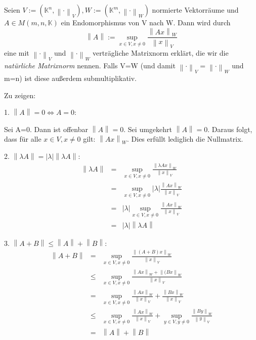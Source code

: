 \documentclass[10pt]{scrbook}
\begin{document}
\begin{Sa}
Seien $V:=(\mathbb{K}^n, \left\|\cdot\right\|_V), W:=(\mathbb{K}^m, \left\|\cdot\right\|_W)$ normierte Vektorräume und $A\in M(m, n, \mathbb{K})$ ein Endomorphismus von V nach W. Dann wird durch
\begin{displaymath}
	 \left\|A\right\|:=\sup_{x\in V, x\neq 0}\frac{\left\|A x\right\|_W}{\left\|x\right\|_V}
\end{displaymath}
eine mit $\left\|\cdot\right\|_V$ und $\left\|\cdot\right\|_W$ verträgliche Matrixnorm erklärt, die wir die \emph{natürliche Matrixnorm} nennen. Falls V=W (und damit $\left\|\cdot\right\|_V=\left\|\cdot\right\|_W$ und m=n) ist diese außerdem submultiplikativ.
\end{Sa}
\begin{bew}
Zu zeigen:

1. $\left\|A\right\|=0\Leftrightarrow A=0$:

Sei A=0. Dann ist offenbar $\left\|A\right\|=0$. Sei umgekehrt $\left\|A\right\|=0$. Daraus folgt, dass für alle $x\in V, x\neq 0$ gilt: $\left\|A x\right\|_W$. Dies erfüllt lediglich die Nullmatrix.

2. $\left\|\lambda A\right\|=\left|\lambda\right| \left\|\lambda A\right\|$:
\begin{eqnarray*}
\left\|\lambda A\right\| & = & \sup_{x\in V, x\neq 0}\frac{\left\|\lambda A x\right\|_W}{\left\|x\right\|_V} \\
& = & \sup_{x\in V, x\neq 0}\left|\lambda\right| \frac{\left\|A x\right\|_W}{\left\|x\right\|_V} \\
& = & \left|\lambda\right| \sup_{x\in V, x\neq 0} \frac{\left\|A x\right\|_W}{\left\|x\right\|_V} \\
& = & \left|\lambda\right| \left\|\lambda A\right\|
\end{eqnarray*}

3. $\left\|A+B\right\|\leq \left\|A\right\|+\left\|B\right\|$:
\begin{eqnarray*}
\left\|A+B\right\| & = & \sup_{x\in V, x\neq 0}\frac{\left\|(A+B) x\right\|_W}{\left\|x\right\|_V} \\
& \leq & \sup_{x\in V, x\neq 0}\frac{\left\|A x\right\|_W+\left\|(B x\right\|_W}{\left\|x\right\|_V} \\
& = & \sup_{x\in V, x\neq 0}\frac{\left\|A x\right\|_W}{\left\|x\right\|_V}+\frac{\left\|B x\right\|_W}{\left\|x\right\|_V} \\
& \leq & \sup_{x\in V, x\neq 0}\frac{\left\|A x\right\|_W}{\left\|x\right\|_V}+\sup_{y\in V, y\neq 0}\frac{\left\|B y\right\|_W}{\left\|y\right\|_V} \\
& = & \left\|A\right\|+\left\|B\right\|
\end{eqnarray*}


\end{bew}
\end{document}
